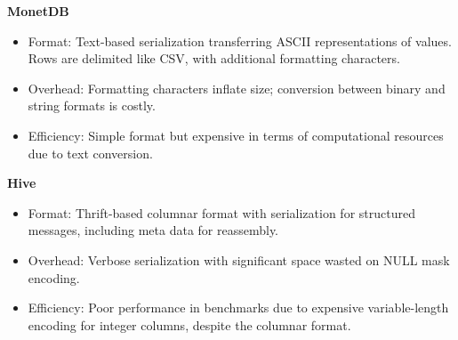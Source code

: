 \documentclass[sigconf]{acmart}
\begin{document}
\textbf{MonetDB}
\begin{itemize}
  \item Format: Text-based serialization transferring ASCII representations of values. Rows are delimited like CSV, with additional formatting characters.
  \item Overhead: Formatting characters inflate size; conversion between binary and string formats is costly.
  \item Efficiency: Simple format but expensive in terms of computational resources due to text conversion.
\end{itemize}

\textbf{Hive}
\begin{itemize}
  \item Format: Thrift-based columnar format with serialization for structured messages, including meta data for reassembly.
  \item Overhead: Verbose serialization with significant space wasted on NULL mask encoding.
  \item Efficiency: Poor performance in benchmarks due to expensive variable-length encoding for integer columns, despite the columnar format.
\end{itemize}

\end{document}

